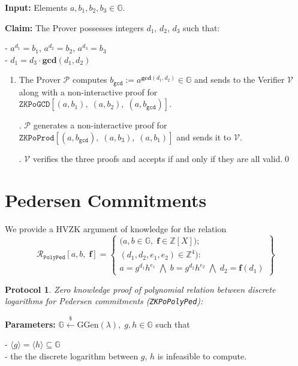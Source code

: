 \documentclass[11pt, lettersize, notitlepage, leqno, footskip=0.6cm]{article}
\newcommand{\bz}{\mathbb Z}
\newcommand{\ttt}{\texttt}
\newcommand{\bG}{\mathbb{G}}
\newcommand{\la}{\langle}
\newcommand{\ra}{\rangle}
\newcommand{\mc}{\mathcal}
\newcommand{\mb}{\mathbb}
\newcommand{\mbf}{\mathbf}
\newcommand{\mr}{\mathrm}
\newcommand{\lamb}{\lambda}
\newcommand{\sub}{\subseteq}
\newcommand{\mP}{\mc{P}}
\newcommand{\V}{\mc{V}}
\newcommand{\vs}{\vspace{-0.15cm}}
\newcommand{\noin}{\noindent}
\newcommand{\GCD}{\mbf{gcd}}
\newtheorem{Prot}[Thm]{Protocol}
\numberwithin{equation}{section}
\begin{document}
\noin \textbf{Input:} Elements $a, b_1, b_2, b_3 \in \mb{G}$.

\noin \textbf{Claim:} The Prover possesses integers $d_1$, $d_2$, $d_3$ such that:

\noin - $a^{d_1} = b_1$, $a^{d_2} = b_2$, $a^{d_3} = b_3$\\
\noin - $d_1 = d_3\cdot \GCD(d_1,d_2)$
 

\begin{enumerate}[wide, labelwidth=!, labelindent=0pt]\vs \item The Prover $\mP$ computes $b_{\ttt{gcd}}:= a^{\GCD(d_1,d_2)}\in \bG$ and sends to the Verifier $\V$ along with a non-interactive proof for $\ttt{ZKPoGCD}[(a,b_1),\;(a,b_2),\;(a,b_{\ttt{gcd}})]$.

\noin 2. $\mP$ generates a non-interactive proof for $\ttt{ZKPoProd}[(a, b_{\ttt{gcd}}),\;(a, b_3),\;(a,b_1)]$ and sends it to $\V$.

\noin 3. $\V$ verifies the three proofs and accepts if and only if they are all valid.\qed \end{enumerate}

\section{\fontsize{11}{11}\selectfont Pedersen Commitments}

We provide a HVZK argument of knowledge for the relation \[
  \mc{R}_{{\ttt{PolyPed}}}[a,b,\;\mbf{f}] = \left\{\begin{array}{l}
    \big(a,b\in\mb{G},\;\mbf{f}\in\bz[X]\big);\\
    (d_1, d_2, e_1,e_2)\in\mb{Z}^4): \\
    a = g^{d_1}h^{e_1}\; \bigwedge\; b = g^{d_2}h^{e_2}\; \bigwedge \;d_2 = \mbf{f}(d_1)
  \end{array}\right\}
\] 


\begin{Prot} \normalfont \hypertarget{PolyPed}{\textit{Zero knowledge proof of polynomial relation between discrete logarithms for Pedersen commitments}} (\verb|ZKPoPolyPed|):\end{Prot} \vspace{-0.3cm}

\noin \textbf{Parameters:} $\mb{G}\xleftarrow{\$} \mr{GGen}(\lamb), \; g, h\in \mb{G}$ such that

\noin - $\la g \ra = \la h \ra\sub \bG$ \\
\noin - the the discrete logarithm between $g$, $h$ is infeasible to compute.
\end{document}
